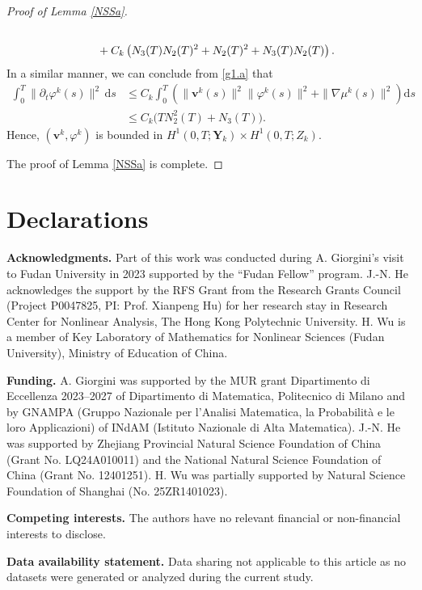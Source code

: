 \documentclass[11pt,reqno]{amsart}
\begin{document}
\begin{proof}[Proof of Lemma \ref{NSSa}]
\begin{align*}
\notag\\
&\qquad + C_k \left( N_3(T) N_2(T)^2 + N_2(T)^2 + N_3(T) N_2(T)\right).
\end{align*}
In a similar manner, we can conclude from \eqref{g1.a} that
\begin{align*}
\int_0^T \| \partial_t \varphi^k(s)\|^2 \, \mathrm{d}s
& \leq C_k \int_0^T \left( \| \bm{v}^k(s)\|^2 \| \varphi^k(s)\|^2
+\| \nabla  \mu^k(s)\|^2 \right) \mathrm{d}s
\\
&\leq C_k \big(  T N^2_2(T) + N_3(T) \big).
\end{align*}
%
Hence,  $(\bm{v}^k,\varphi^k)$ is bounded in $H^1(0,T;\bm{Y}_{k})\times H^1(0,T;Z_{k})$.

The proof of Lemma \ref{NSSa} is complete.
\end{proof}




\section*{Declarations}
\noindent \textbf{Acknowledgments.}
Part of this work was conducted during A. Giorgini’s visit to Fudan University in 2023 supported by the ``Fudan Fellow'' program. J.-N. He acknowledges the support by the RFS Grant from the Research Grants Council (Project P0047825, PI: Prof. Xianpeng Hu) for her research stay in Research Center for Nonlinear Analysis, The Hong Kong Polytechnic University.
H. Wu is a member of Key Laboratory of Mathematics for Nonlinear Sciences (Fudan University), Ministry of Education of China.
\smallskip

\noindent \textbf{Funding.}
A. Giorgini was supported by the MUR grant Dipartimento di Eccellenza 2023--2027 of Dipartimento di Matematica, Politecnico di Milano and by GNAMPA (Gruppo Nazionale per l’Analisi Matematica, la Probabilit\`{a} e le loro Applicazioni) of INdAM (Istituto Nazionale di Alta Matematica).
J.-N. He was supported by Zhejiang Provincial Natural Science Foundation of China (Grant No. LQ24A010011) and the National Natural Science Foundation of China (Grant No. 12401251).
H. Wu was partially supported by Natural Science Foundation of Shanghai (No. 25ZR1401023).
\smallskip

\noindent \textbf{Competing interests.}
The authors have no relevant financial or non-financial interests to disclose.
\smallskip

\noindent \textbf{Data availability statement.}
Data sharing not applicable to this article as no datasets were generated or analyzed during the current study.
\end{document}
